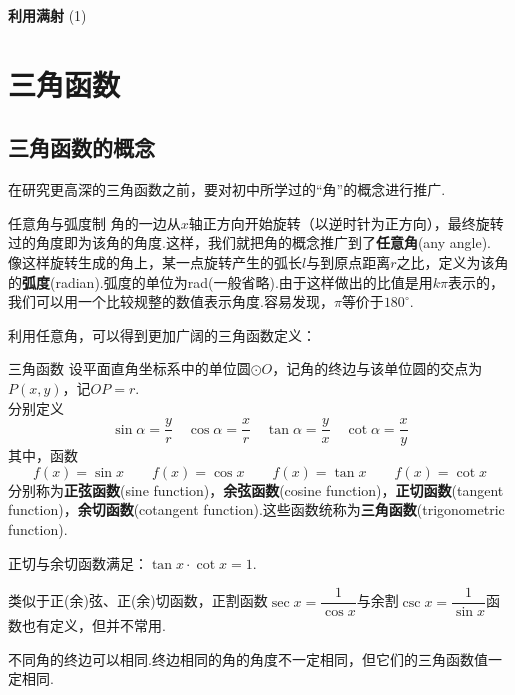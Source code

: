 \documentclass[lang=cn, zihao=5]{elegantbook}
\newcommand{\examplefont}[1]{\color{mgreen} \textbf{#1}}
\begin{document}
\begin{example}{\examplefont{利用满射}}
	(1)%
\end{example}

\chapter{三角函数}

\section{三角函数的概念}

在研究更高深的三角函数之前，要对初中所学过的“角”的概念进行推广.

\begin{definition}{任意角与弧度制} %
    角的一边从$x$轴正方向开始旋转（以逆时针为正方向），最终旋转过的角度即为该角的角度.这样，我们就把角的概念推广到了\textbf{任意角}(any angle).\\
    像这样旋转生成的角上，某一点旋转产生的弧长$l$与到原点距离$r$之比，定义为该角的\textbf{弧度}(radian).弧度的单位为rad(一般省略).由于这样做出的比值是用$k \pi$表示的，我们可以用一个比较规整的数值表示角度.容易发现，$\pi$等价于$180^{\circ}$.
\end{definition}

利用任意角，可以得到更加广阔的三角函数定义：

\begin{definition}{三角函数} %
    设平面直角坐标系中的单位圆$\odot O$，记角的终边与该单位圆的交点为$P(x,y)$，记$OP=r$.\\
    分别定义$$\sin{\alpha}=\frac{y}{r} \quad \cos{\alpha}=\frac{x}{r} \quad \tan{\alpha}=\frac{y}{x} \quad \cot{\alpha}=\frac{x}{y}$$
    其中，函数$$f(x)=\sin{x} \qquad f(x)=\cos{x} \qquad f(x)=\tan{x} \qquad f(x)=\cot{x}$$
    分别称为\textbf{正弦函数}(sine function)，\textbf{余弦函数}(cosine function)，\textbf{正切函数}(tangent function)，\textbf{余切函数}(cotangent function).这些函数统称为\textbf{三角函数}(trigonometric function).
\end{definition}
\begin{remark}
    正切与余切函数满足：$\tan{x} \cdot \cot{x} = 1$.
\end{remark}
\begin{remark}
    类似于正(余)弦、正(余)切函数，正割函数$\sec{x}=\dfrac{1}{\cos{x}}$与余割$\csc{x}=\dfrac{1}{\sin{x}}$函数也有定义，但并不常用.
\end{remark}
\begin{remark}
    不同角的终边可以相同.终边相同的角的角度不一定相同，但它们的三角函数值一定相同.
\end{remark}
\end{document}

